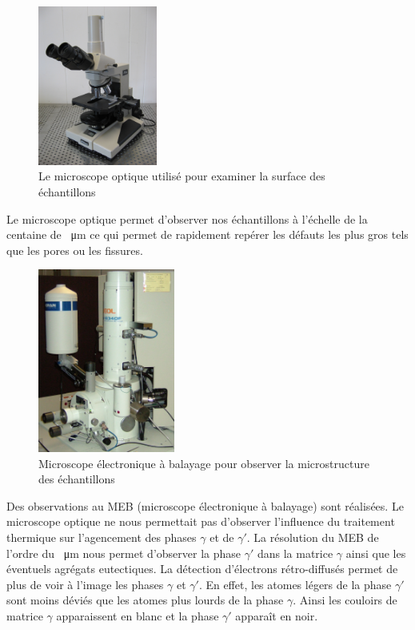 \begin{figure}[H]
    \centering
    \includegraphics[width=0.35\textwidth]{images/optique.jpg}
    \caption{Le microscope optique utilisé pour examiner la surface des échantillons}
    \label{fig:microscope_optique}
\end{figure}


Le microscope optique permet d'observer nos échantillons à l'échelle de la centaine 
de \SI{}{\micro\metre} ce qui permet de rapidement repérer les défauts les plus gros 
tels que les pores ou les fissures.\\


\begin{figure}[H]
    \centering
    \includegraphics[width=0.4\textwidth]{images/JEOL_JSM-6340F.jpg}
    \caption{Microscope électronique à balayage pour observer la microstructure des échantillons}
    \label{fig:MEB}
\end{figure}


Des observations au MEB (microscope électronique à balayage) sont réalisées.
Le microscope optique ne nous permettait pas d'observer l'influence 
du traitement thermique sur l'agencement des phases $\gamma$ et de $\gamma'$. La résolution
du MEB de l'ordre du \SI{}{\micro\metre} nous permet d'observer la phase $\gamma'$ dans la matrice
$\gamma$ ainsi que les éventuels agrégats eutectiques. La détection d'électrons rétro-diffusés
permet de plus de voir à l'image les phases $\gamma$ et $\gamma'$. En effet, les atomes légers
de la phase $\gamma'$ sont moins déviés que les atomes plus lourds de la phase $\gamma$. Ainsi
les couloirs de matrice $\gamma$ apparaissent en blanc et la phase $\gamma'$ apparaît en noir.

